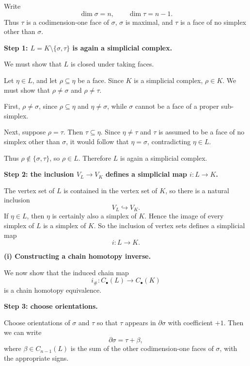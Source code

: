\begin{solution}
Write
\[
\dim \sigma = n,
\qquad
\dim \tau = n-1.
\]
Thus \(\tau\) is a codimension-one face of \(\sigma\), \(\sigma\) is maximal, and \(\tau\) is a face of no simplex other than \(\sigma\).

\par

\textbf{Step 1: \(L=K\setminus\{\sigma,\tau\}\) is again a simplicial complex.}

We must show that \(L\) is closed under taking faces.

Let \(\eta\in L\), and let \(\rho\subseteq \eta\) be a face. Since \(K\) is a simplicial complex, \(\rho\in K\). We must show that \(\rho\neq \sigma\) and \(\rho\neq \tau\).

First, \(\rho\neq \sigma\), since \(\rho\subseteq \eta\) and \(\eta\neq \sigma\), while \(\sigma\) cannot be a face of a proper sub-simplex.

Next, suppose \(\rho=\tau\). Then \(\tau\subseteq \eta\). Since \(\eta\neq \tau\) and \(\tau\) is assumed to be a face of no simplex other than \(\sigma\), it would follow that \(\eta=\sigma\), contradicting \(\eta\in L\).

Thus \(\rho\notin \{\sigma,\tau\}\), so \(\rho\in L\). Therefore \(L\) is again a simplicial complex.

\par

\textbf{Step 2: the inclusion \(V_L\to V_K\) defines a simplicial map \(i:L\to K\).}

The vertex set of \(L\) is contained in the vertex set of \(K\), so there is a natural inclusion
\[
V_L\hookrightarrow V_K.
\]
If \(\eta\in L\), then \(\eta\) is certainly also a simplex of \(K\). Hence the image of every simplex of \(L\) is a simplex of \(K\). So the inclusion of vertex sets defines a simplicial map
\[
i:L\to K.
\]

\par

\textbf{(i) Constructing a chain homotopy inverse.}

We now show that the induced chain map
\[
i_\#:C_\bullet(L)\to C_\bullet(K)
\]
is a chain homotopy equivalence.

\par

\textbf{Step 3: choose orientations.}

Choose orientations of \(\sigma\) and \(\tau\) so that \(\tau\) appears in \(\partial \sigma\) with coefficient \(+1\). Then we can write
\[
\partial \sigma = \tau + \beta,
\]
where \(\beta\in C_{n-1}(L)\) is the sum of the other codimension-one faces of \(\sigma\), with the appropriate signs.


\end{solution}

